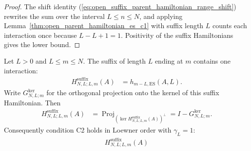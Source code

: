 \begin{proof}
    \leanok
    The shift identity (\ref{eq:open_suffix_parent_hamiltonian_range_shift}) rewrites the
    sum over the interval $L\leq n\leq N$, and applying
    Lemma~\ref{thm:open_parent_hamiltonian_es_c1} with suffix length $L$
    counts each interaction once because $L-L+1=1$.  Positivity of the
    suffix Hamiltonians gives the lower bound.
\end{proof}

\begin{lemma}
    \label{thm:open_suffix_parent_hamiltonian_es_c2}
    \leanok
    Let $L>0$ and $L\leq m\leq N$. The suffix of length $L$ ending at $m$
    contains one interaction:
    \begin{align}
        H^{\mathrm{suffix}}_{N,L;L,m}(A)
         & =h_{m-L,\mathrm{ES}}(A,L).
        \label{eq:open_suffix_parent_hamiltonian_unique_term}
    \end{align}
    Write $G^{\ker}_{N,L;m}$ for the orthogonal projection onto the kernel of
    this suffix Hamiltonian. Then
    \begin{align}
        H^{\mathrm{suffix}}_{N,L;L,m}(A)
         & =\operatorname{Proj}_{(\ker H^{\mathrm{suffix}}_{N,L;L,m}(A))^\perp}
        =I-G^{\ker}_{N,L;m}.
        \label{eq:open_suffix_parent_hamiltonian_id_sub_kernel}
    \end{align}
    Consequently condition C2 holds in Loewner order with $\gamma_L=1$:
    \begin{align}
        H^{\mathrm{suffix}}_{N,L;L,m}(A)

\end{align}
\end{lemma}
